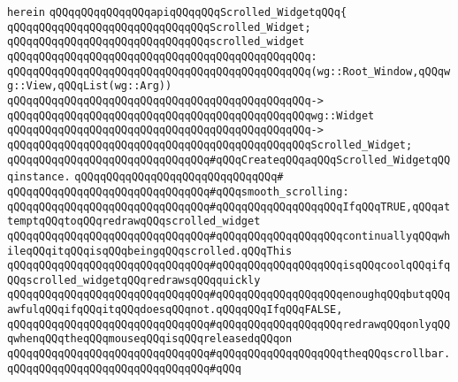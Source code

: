 \verb|herein|\newline
\newline
\verb|qQQqqQQqqQQqqQQqapiqQQqqQQqScrolled_WidgetqQQq{|\newline
\newline
\verb|qQQqqQQqqQQqqQQqqQQqqQQqqQQqqQQqScrolled_Widget;|\newline
\newline
\verb|qQQqqQQqqQQqqQQqqQQqqQQqqQQqqQQqscrolled_widget|\newline
\verb|qQQqqQQqqQQqqQQqqQQqqQQqqQQqqQQqqQQqqQQqqQQqqQQq:|\newline
\verb|qQQqqQQqqQQqqQQqqQQqqQQqqQQqqQQqqQQqqQQqqQQqqQQq(wg::Root_Window,qQQqwg::View,qQQqList(wg::Arg))|\newline
\verb|qQQqqQQqqQQqqQQqqQQqqQQqqQQqqQQqqQQqqQQqqQQqqQQq->|\newline
\verb|qQQqqQQqqQQqqQQqqQQqqQQqqQQqqQQqqQQqqQQqqQQqqQQqwg::Widget|\newline
\verb|qQQqqQQqqQQqqQQqqQQqqQQqqQQqqQQqqQQqqQQqqQQqqQQq->|\newline
\verb|qQQqqQQqqQQqqQQqqQQqqQQqqQQqqQQqqQQqqQQqqQQqqQQqScrolled_Widget;|\newline
\newline
\verb|qQQqqQQqqQQqqQQqqQQqqQQqqQQqqQQq#qQQqCreateqQQqaqQQqScrolled_WidgetqQQqinstance.|\newline
\verb|qQQqqQQqqQQqqQQqqQQqqQQqqQQqqQQq#|\newline
\verb|qQQqqQQqqQQqqQQqqQQqqQQqqQQqqQQq#qQQqsmooth_scrolling:|\newline
\verb|qQQqqQQqqQQqqQQqqQQqqQQqqQQqqQQq#qQQqqQQqqQQqqQQqqQQqIfqQQqTRUE,qQQqattemptqQQqtoqQQqredrawqQQqscrolled_widget|\newline
\verb|qQQqqQQqqQQqqQQqqQQqqQQqqQQqqQQq#qQQqqQQqqQQqqQQqqQQqcontinuallyqQQqwhileqQQqitqQQqisqQQqbeingqQQqscrolled.qQQqThis|\newline
\verb|qQQqqQQqqQQqqQQqqQQqqQQqqQQqqQQq#qQQqqQQqqQQqqQQqqQQqisqQQqcoolqQQqifqQQqscrolled_widgetqQQqredrawsqQQqquickly|\newline
\verb|qQQqqQQqqQQqqQQqqQQqqQQqqQQqqQQq#qQQqqQQqqQQqqQQqqQQqenoughqQQqbutqQQqawfulqQQqifqQQqitqQQqdoesqQQqnot.qQQqqQQqIfqQQqFALSE,|\newline
\verb|qQQqqQQqqQQqqQQqqQQqqQQqqQQqqQQq#qQQqqQQqqQQqqQQqqQQqredrawqQQqonlyqQQqwhenqQQqtheqQQqmouseqQQqisqQQqreleasedqQQqon|\newline
\verb|qQQqqQQqqQQqqQQqqQQqqQQqqQQqqQQq#qQQqqQQqqQQqqQQqqQQqtheqQQqscrollbar.|\newline
\verb|qQQqqQQqqQQqqQQqqQQqqQQqqQQqqQQq#qQQq|\newline
